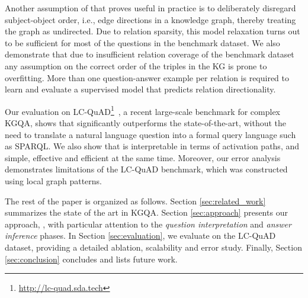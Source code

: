 Another assumption of \OurApproach{} that proves useful in practice is to deliberately disregard subject-object order, i.e., edge directions in a knowledge graph, thereby treating the graph as undirected.
Due to relation sparsity, this model relaxation turns out to be sufficient for most of the questions in the benchmark dataset.
We also demonstrate that due to insufficient relation coverage of the benchmark dataset any assumption on the correct order of the triples in the KG is prone to overfitting.
More than one question-answer example per relation is required to learn and evaluate a supervised model that predicts relation directionality.

Our evaluation on LC-QuAD\footnote{\url{http://lc-quad.sda.tech}}~\cite{DBLP:conf/semweb/TrivediMDL17}, a recent large-scale benchmark for complex KGQA, shows that \OurApproach{} significantly outperforms the state-of-the-art, without the need to translate a natural language question into a formal query language such as SPARQL.
We also show that \OurApproach{} is interpretable in terms of activation paths, and simple, effective and efficient at the same time. Moreover, our error analysis demonstrates limitations of the LC-QuAD benchmark, which was constructed using local graph patterns.

The rest of the paper is organized as follows. Section \ref{sec:related_work} summarizes the state of the art in KGQA. 
Section \ref{sec:approach} presents our approach, \OurApproach{}, with particular attention to the \emph{question interpretation} and \emph{answer inference} phases. 
In Section \ref{sec:evaluation}, we evaluate \OurApproach{} on the LC-QuAD dataset, providing a detailed ablation, scalability and error study. 
Finally, Section \ref{sec:conclusion} concludes and lists future work.
